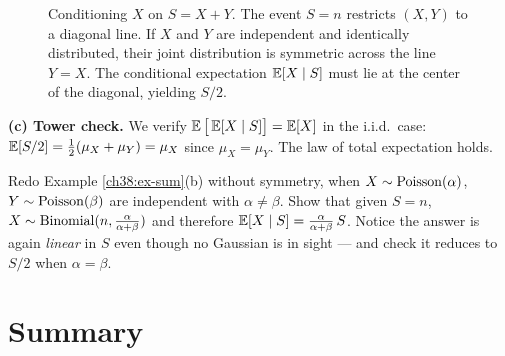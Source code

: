\begin{example}
\begin{figure}[htbp]
\begin{tikzpicture}[scale=0.7, >=Stealth]
\end{tikzpicture}
\caption{Conditioning $X$ on $S = X + Y$. The event $S = n$ restricts $(X,Y)$ to a diagonal line. If $X$ and $Y$ are independent and identically distributed, their joint distribution is symmetric across the line $Y = X$. The conditional expectation $\operatorname{\mathbb{E}}[X\mid S]$ must lie at the center of the diagonal, yielding $S/2$.}
\label{ch38:fig-sum-symmetry}
\end{figure}

\textbf{(c) Tower check.} We verify $\operatorname{\mathbb{E}}\big[\operatorname{\mathbb{E}}[X\mid S]\big] = \operatorname{\mathbb{E}}[X]$ in the i.i.d.\ case:
$\operatorname{\mathbb{E}}[S/2] = \tfrac12(\mu_X + \mu_Y) = \mu_X$ since $\mu_X = \mu_Y$. The law of total expectation holds.
\end{example}

\begin{labbox}
Redo Example \ref{ch38:ex-sum}(b) without symmetry, when $X \sim \operatorname{Poisson}(\alpha)$, $Y \sim
\operatorname{Poisson}(\beta)$ are independent with $\alpha \ne \beta$. Show that given $S = n$, $X \sim \operatorname{Binomial}(n,
\tfrac{\alpha}{\alpha+\beta})$ and therefore $\operatorname{\mathbb{E}}[X\mid S] = \tfrac{\alpha}{\alpha+\beta}\,S$. Notice
the answer is again \emph{linear} in $S$ even though no Gaussian is in sight --- and check it reduces
to $S/2$ when $\alpha = \beta$.
\end{labbox}

\section{Summary}
\label{ch38:summary}

